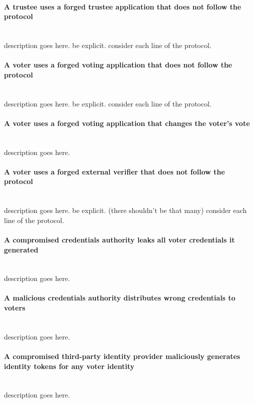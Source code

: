 \paragraph{A trustee uses a forged trustee application that does not follow the protocol} \mbox{} \\
description goes here.
be explicit.
consider each line of the protocol.


\paragraph{A voter uses a forged voting application that does not follow the protocol} \mbox{} \\
description goes here.
be explicit.
consider each line of the protocol.


\paragraph{A voter uses a forged voting application that changes the voter's vote} \mbox{} \\
description goes here.


\paragraph{A voter uses a forged external verifier that does not follow the protocol} \mbox{} \\
description goes here.
be explicit. (there shouldn't be that many)
consider each line of the protocol.


\paragraph{A compromised credentials authority leaks all voter credentials it generated} \mbox{} \\
description goes here.


\paragraph{A malicious credentials authority distributes wrong credentials to voters} \mbox{} \\
description goes here.


\paragraph{A compromised third-party identity provider maliciously generates identity tokens for any voter identity} \mbox{} \\
description goes here.


